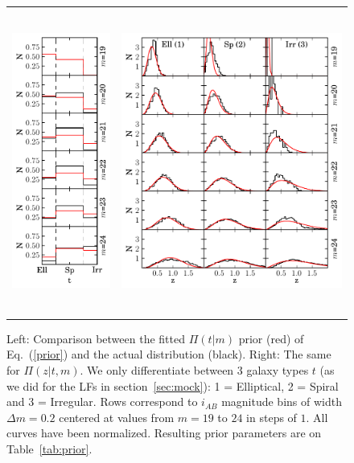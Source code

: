 \begin{figure}
\centering
\begin{tabular}{rl}
\includegraphics[height=100mm]{./plots/pau_t_prior_plot.pdf} & \includegraphics[height=100mm]{./plots/pau_z_prior_plot.pdf} 
\end{tabular}
\caption{Left: Comparison between the fitted $\Pi(t|m)$ prior (red) of Eq.~(\ref{prior}) and the actual distribution (black). Right: The same for $\Pi(z|t,m)$. We only differentiate between 3 galaxy types $t$ (as we did for the LFs in section~\ref{sec:mock}): 1 = Elliptical, 2 = Spiral and 3 = Irregular. Rows correspond to $i_{AB}$ magnitude bins of width $\Delta m=0.2$ centered at values from $m=19$ to $24$ in steps of $1$. All curves have been normalized. Resulting prior parameters are on Table~\ref{tab:prior}.}
\label{pau_prior_plot}
\end{figure}
